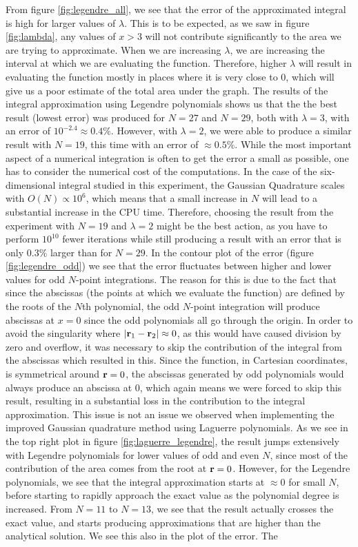 \documentclass[a4paper,10pt,english]{article}
\begin{document}
From figure \ref{fig:legendre_all}, we see that the error of the approximated integral is high for larger values of $\lambda$. This is to be expected, as we saw in figure \ref{fig:lambda}, any values of $x>3$ will not contribute significantly to the area we are trying to approximate. When we are increasing $\lambda$, we are increasing the interval at which we are evaluating the function. Therefore, higher $\lambda$ will result in evaluating the function mostly in places where it is very close to $0$, which will give us a poor estimate of the total area under the graph.  The results of the integral approximation using Legendre polynomials shows us that the the best result (lowest error) was produced for $N = 27$ and $N=29$, both with $\lambda = 3$, with an error of $10^{-2.4} \approx 0.4\%$. However, with $\lambda = 2$, we were able to produce a similar result with $N=19$, this time with an error of $\approx 0.5\%$. While the most important aspect of a numerical integration is often to get the error a small as possible, one has to consider the numerical cost of the computations. In the case of the six-dimensional integral studied in this experiment, the Gaussian Quadrature scales with $O(N) \propto 10^6$, which means that a small increase in $N$ will lead to a substantial increase in the CPU time. Therefore, choosing the result from the experiment with $N=19$ and $\lambda = 2$ might be the best action, as you have to perform $10^{10}$ fewer iterations while still producing a result with an error that is only $0.3\%$ larger than for $N=29$. In the contour plot of the error (figure \ref{fig:legendre_odd}) we see that the error fluctuates between higher and lower values for odd $N$-point integrations. The reason for this is due to the fact that since the abscissas (the points at which we evaluate the function) are defined by the roots of the $N$th polynomial, the odd $N$-point integration will produce abscissas at $x=0$ since the odd polynomials all go through the origin. In order to avoid the singularity where $|\bold{r}_1 - \bold{r}_2| \approx 0$, as this would have caused division by zero and overflow, it was necessary to skip the contribution of the integral from the abscissas which resulted in this. Since the function, in Cartesian coordinates, is symmetrical around $\bold{r} = 0$, the abscissas generated by odd polynomials would always produce an abscissa at $0$, which again means we were forced to skip this result, resulting in a substantial loss in the contribution to the integral approximation. This issue is not an issue we observed when implementing the improved Gaussian quadrature method using Laguerre polynomials. As we see in the top right plot in figure \ref{fig:laguerre_legendre}, the result jumps extensively with Legendre polynomials for lower values of odd and even $N$, since most of the contribution of the area comes from the root at $\bold{r} = 0$. However, for the Legendre polynomials, we see that the integral approximation starts at $\approx 0$ for small $N$, before starting to rapidly approach the exact value as the polynomial degree is increased. From $N = 11$ to $N=13$, we see that the result actually crosses the exact value, and starts producing approximations that are higher than the analytical solution. We see this also in the plot of the error. The 
\end{document}
